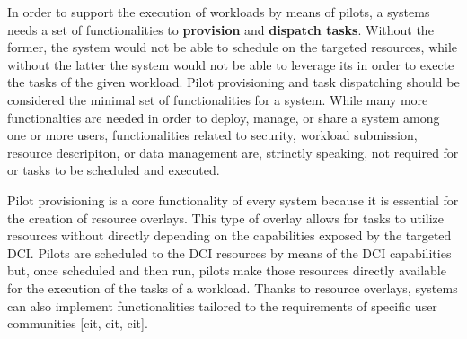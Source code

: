 \documentclass{sig-alternate}
\begin{document}

In order to support the execution of workloads by means of pilots, a
\pilot systems needs a set of functionalities to \textbf{provision
\pilots} and \textbf{dispatch tasks}. Without the former, the \pilot
system would not be able to schedule \pilotjobs on the targeted
resources, while without the latter the \pilot system would not be able
to leverage its \pilots in order to execte the tasks of the given
workload.
Pilot provisioning and task dispatching should be considered
the minimal set of functionalities for a \pilot system. While many more
functionalties are needed in order to deploy, manage, or share a \pilot
system among one or more users, functionalities related to security,
workload submission, resource descripiton, or data management are,
strinctly speaking, not required for \pilotjobs or tasks to be scheduled
and executed.


Pilot provisioning is a core functionality of every \pilot system
because it is essential for the creation of resource overlays.
This type
of overlay allows for tasks to utilize resources without directly
depending on the capabilities exposed by the targeted DCI. Pilots are
scheduled to the DCI resources by means of the DCI capabilities but,
once scheduled and then run, pilots make those resources directly
available for the execution of the tasks of a workload. Thanks to
resource overlays, \pilot systems can also implement functionalities
tailored to the requirements of specific user communities [cit, cit,
cit].
\end{document}
